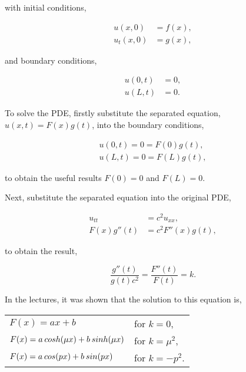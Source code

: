 \documentclass[12pt]{article}
\begin{document}
with initial conditions,

\begin{align*}
u(x,0) &= f(x), \\[0.5em]
u_t(x,0) &= g(x),
\end{align*}

and boundary conditions,

\begin{align*}
u(0,t) &= 0, \\[0.5em]
u(L,t) &= 0.
\end{align*}

\vspace{2mm}

To solve the PDE, firstly substitute the separated equation, $u(x,t) = F(x)g(t)$, into the boundary conditions,

\begin{align*}
u(0,t)=0=F(0)g(t), \\[0.7em]
u(L,t)=0=F(L)g(t), 
\end{align*}

\vspace{4mm}

to obtain the useful results $F(0)=0$ and $F(L)=0$.

\vspace{4mm}

Next, substitute the separated equation into the original PDE,

\begin{align*}
u_{tt} &= c^2u_{xx},  \\[0.8em]
F(x)g''(t) &= c^2F''(x)g(t),
\end{align*}

\vspace{2mm}

to obtain the result,

$$ \frac{g''(t)}{g(t)c^2} = \frac{F''(t)}{F(t)} = k. $$

\vspace{4mm}

In the lectures, it was shown that the solution to this equation is,

\vspace{2mm}

\begin{center}
\begin{tabular}{p{70mm}p{40mm}}
$F(x) = ax+b$ 	& for $k=0$, \\[1em]
$F(x) = a\hspace{0.2em}cosh(\mu x) + b\hspace{0.2em}sinh(\mu x)$ 	& for $k=\mu^2$, \\[1em]
$F(x) = a\hspace{0.2em}cos(p x) + b\hspace{0.2em}sin(p x)$ 	& for $k=-p^2$. \\[1em]
\end{tabular}
\end{center}
\end{document}
